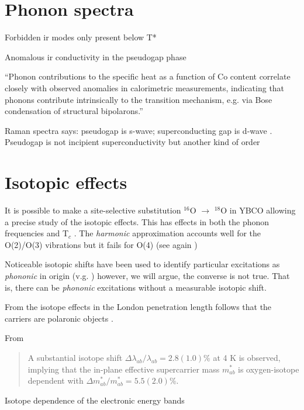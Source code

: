 \section{Phonon spectra}
\label{sec:phonon_spectra}

Forbidden ir modes only present below T* \cite{?}

Anomalous ir conductivity in the pseudogap phase \cite{Basov1996}

``Phonon contributions to the specific heat as a function of Co content correlate closely with observed anomalies in calorimetric measurements, indicating that phonons contribute intrinsically to the transition mechanism, e.g. via Bose condensation of structural bipolarons.'' \cite{Obhi1990} 

Raman spectra says: pseudogap is s-wave; superconducting gap is d-wave \cite{Sakai2013}.
Pseudogap is not incipient superconductivity but another kind of order \cite{He2011}

\section{Isotopic effects}
\label{sec:isotopic_effects}

It is possible to make a site-selective substitution $^{16}$O $\rightarrow$ $^{18}$O in YBCO \cite{Conder1993} allowing a precise study of the isotopic effects. 
This has effects in both the phonon frequencies \cite{Ruani1994} and T$_{c}$ \cite{Zech1994,Cardona1988}. 
The \textit{harmonic} approximation accounts well for the O(2)/O(3) vibrations but it fails for O(4) (see again \cite{Ruani1994})

Noticeable isotopic shifts have been used to identify particular excitations as \textit{phononic} in origin (v.g. \cite{Thomsen1990}) however, we will argue, the converse is not true. 
That is, there can be \textit{phononic} excitations without a measurable isotopic shift.

From the isotope effects in the London penetration length follows that the carriers are polaronic objects \cite{Zhao1997}.

From \cite{Khasanov2004} \begin{quote}A substantial isotope shift $\Delta\lambda_{ab}/\lambda_{ab}=2.8(1.0)$\% at 4 K is observed, implying that the in-plane effective supercarrier mass $m^*_{ab}$ is oxygen-isotope dependent with $\Delta m^*_{ab} / m^*_{ab}=5.5(2.0)$\%.\end{quote}

Isotope dependence of the electronic energy bands \cite{Gweon2004}

